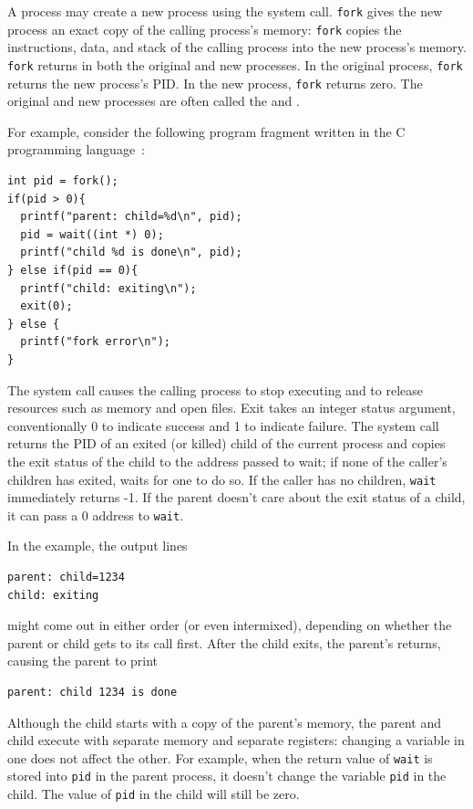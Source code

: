 A process may create a new process using the
system call.
\lstinline{fork}
gives the new process an exact copy of the calling
process's memory: \lstinline{fork} copies the instructions, data, and
stack of the calling process into the new process's memory.
\lstinline{fork}
returns in both the original and new processes.
In the original process, \lstinline{fork} returns the new process's
PID.
In the new process, \lstinline{fork} returns zero.
The original and new processes are often called the
and
.

For example, consider the following program fragment written in the C
programming language~\cite{kernighan}:
\begin{lstlisting}[]
int pid = fork();
if(pid > 0){
  printf("parent: child=%d\n", pid);
  pid = wait((int *) 0);
  printf("child %d is done\n", pid);
} else if(pid == 0){
  printf("child: exiting\n");
  exit(0);
} else {
  printf("fork error\n");
}
\end{lstlisting}
The
system call causes the calling process to stop executing and
to release resources such as memory and open files.
Exit takes an integer status argument,
conventionally 0 to indicate success and 1 to indicate failure.
The
system call returns the PID of an exited (or killed) child of the
current process and copies the exit status of the child to the address
passed to wait; if none of the caller's children
has exited,
waits for one to do so.
If the caller has no children, \lstinline{wait} immediately
returns -1.
If the parent doesn't care about the exit status of a child, it can
pass a 0 address to
\lstinline{wait}.

In the example, the output lines
\begin{lstlisting}[]
parent: child=1234
child: exiting
\end{lstlisting}
might come out in either order (or even intermixed), depending on whether the
parent or child gets to its
call first.
After the child exits, the parent's
returns, causing the parent to print
\begin{lstlisting}[]
parent: child 1234 is done
\end{lstlisting}
Although the child starts with a copy of the parent's memory, the
parent and child execute with separate memory and separate registers:
changing a variable in one does not affect the other. For example, when the
return value of
\lstinline{wait}
is stored into
\lstinline{pid} 
in the parent process,
it doesn't change the variable 
\lstinline{pid}
in the child.  The value of
\lstinline{pid}
in the child will still be zero.

